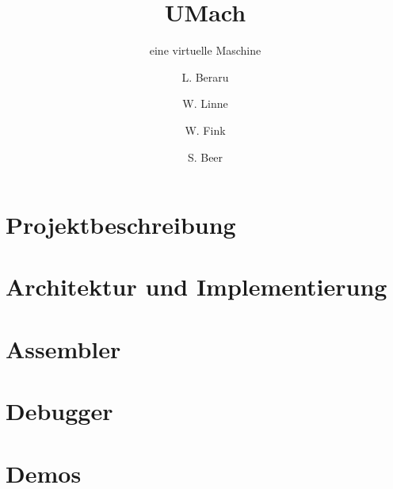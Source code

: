 \documentclass{beamer}
\title{UMach}
\subtitle{eine virtuelle Maschine}
\author{L. Beraru \and W. Linne \and W. Fink \and S. Beer}
\institute{Betreuer: Prof. Dr. Kern\\Georg-Simon-Ohm-Hochschule}
\date{}
\begin{document}
\frame{\titlepage}



\part{Projektbeschreibung}


\part{Architektur und Implementierung}


\part{Assembler}


\part{Debugger}


\part{Demos}

\end{document}
